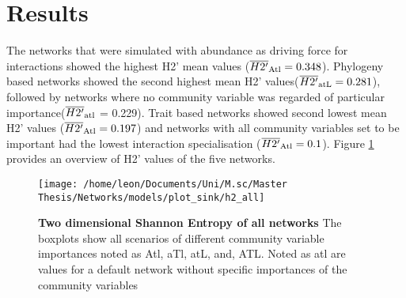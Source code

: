 \documentclass[12pt,a4paper]{article}
\begin{document}
\section{Results}

\begin{table}[H]
\centering
\caption{Mean network robustness after extinction simulation with initial extinction on the lower trophic level}
\label{tab:auc_lower}
\end{table}

The networks that were simulated with abundance as driving force for interactions showed the highest H2' mean values ($\overline{H2'}\textsubscript{Atl} = 0.348$). Phylogeny based networks showed the second highest mean H2' values($\overline{H2'}\textsubscript{atL} = 0.281$), followed by networks where no community variable was regarded of particular importance($\overline{H2'}\textsubscript{atl}$ = 0.229). Trait based networks showed second lowest mean H2' values ($\overline{H2'}\textsubscript{Atl} = 0.197$) and networks with all community variables set to be important had the lowest interaction specialisation ($\overline{H2'}\textsubscript{Atl} = 0.1$). Figure \ref{fig:h2} provides an overview of H2' values of the five networks.
\begin{figure}[H]
	 \texttt{[image: /home/leon/Documents/Uni/M.sc/Master Thesis/Networks/models/plot\_sink/h2\_all]}
	 \caption{\textbf{Two dimensional Shannon Entropy of all networks} The boxplots show all scenarios of different community variable importances noted as Atl, aTl, atL, and, ATL. Noted as atl are values for a default network without specific importances of the community variables}
	 \label{fig:h2}
\end{figure}
\end{document}
